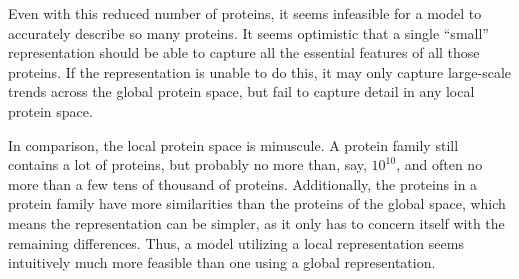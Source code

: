 Even with this reduced number of proteins, it seems infeasible for a model to accurately describe so many proteins. It seems optimistic that a single ``small'' representation should be able to capture all the essential features of all those proteins. If the representation is unable to do this, it may only capture large-scale trends across the global protein space, but fail to capture detail in any local protein space.

In comparison, the local protein space is minuscule. A protein family still contains a lot of proteins, but probably no more than, say, $10^{10}$, and often no more than a few tens of thousand of proteins. Additionally, the proteins in a protein family have more similarities than the proteins of the global space, which means the representation can be simpler, as it only has to concern itself with the remaining differences. Thus, a model utilizing a local representation seems intuitively much more feasible than one using a global representation.



